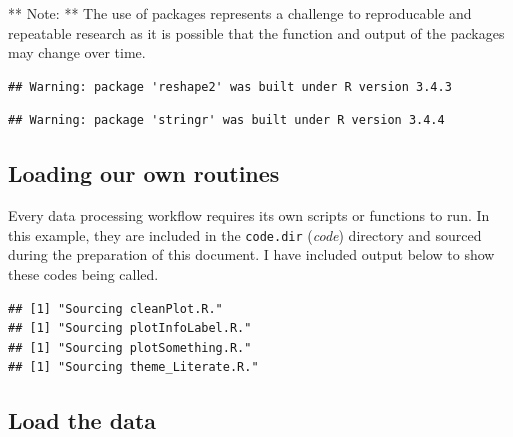\documentclass[11pt,]{article}
\newenvironment{Shaded}{\begin{snugshade}}{\end{snugshade}}
\newcommand{\CharTok}[1]{\textcolor[rgb]{0.31,0.60,0.02}{#1}}
\newcommand{\CommentTok}[1]{\textcolor[rgb]{0.56,0.35,0.01}{\textit{#1}}}
\newcommand{\ControlFlowTok}[1]{\textcolor[rgb]{0.13,0.29,0.53}{\textbf{#1}}}
\newcommand{\DataTypeTok}[1]{\textcolor[rgb]{0.13,0.29,0.53}{#1}}
\newcommand{\KeywordTok}[1]{\textcolor[rgb]{0.13,0.29,0.53}{\textbf{#1}}}
\newcommand{\NormalTok}[1]{#1}
\newcommand{\StringTok}[1]{\textcolor[rgb]{0.31,0.60,0.02}{#1}}
\begin{document}
** Note: ** The use of packages represents a challenge to reproducable and repeatable research as it is possible that the function and output of the packages may change over time.

\begin{verbatim}
## Warning: package 'reshape2' was built under R version 3.4.3
\end{verbatim}

\begin{verbatim}
## Warning: package 'stringr' was built under R version 3.4.4
\end{verbatim}

\hypertarget{loading-our-own-routines}{%
\subsection{Loading our own routines}\label{loading-our-own-routines}}

Every data processing workflow requires its own scripts or functions to run. In this example, they are included in the \texttt{code.dir} (\emph{code}) directory and sourced during the preparation of this document. I have included output below to show these codes being called.

\begin{Shaded}
\end{Shaded}

\begin{verbatim}
## [1] "Sourcing cleanPlot.R."
## [1] "Sourcing plotInfoLabel.R."
## [1] "Sourcing plotSomething.R."
## [1] "Sourcing theme_Literate.R."
\end{verbatim}

\hypertarget{load-the-data}{%
\subsection{Load the data}\label{load-the-data}}
\end{document}
